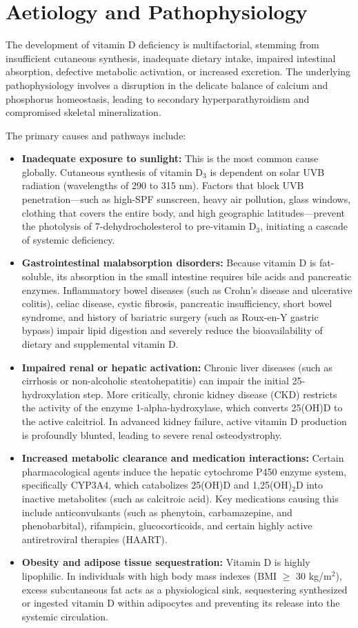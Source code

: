 \section*{Aetiology and Pathophysiology}
The development of vitamin D deficiency is multifactorial, stemming from insufficient cutaneous synthesis, inadequate dietary intake, impaired intestinal absorption, defective metabolic activation, or increased excretion. The underlying pathophysiology involves a disruption in the delicate balance of calcium and phosphorus homeostasis, leading to secondary hyperparathyroidism and compromised skeletal mineralization.

The primary causes and pathways include:
\begin{itemize}
    \item \textbf{Inadequate exposure to sunlight:} This is the most common cause globally. Cutaneous synthesis of vitamin D$_{3}$ is dependent on solar UVB radiation (wavelengths of 290 to 315 nm). Factors that block UVB penetration---such as high-SPF sunscreen, heavy air pollution, glass windows, clothing that covers the entire body, and high geographic latitudes---prevent the photolysis of 7-dehydrocholesterol to pre-vitamin D$_{3}$, initiating a cascade of systemic deficiency.
    \item \textbf{Gastrointestinal malabsorption disorders:} Because vitamin D is fat-soluble, its absorption in the small intestine requires bile acids and pancreatic enzymes. Inflammatory bowel diseases (such as Crohn's disease and ulcerative colitis), celiac disease, cystic fibrosis, pancreatic insufficiency, short bowel syndrome, and history of bariatric surgery (such as Roux-en-Y gastric bypass) impair lipid digestion and severely reduce the bioavailability of dietary and supplemental vitamin D.
    \item \textbf{Impaired renal or hepatic activation:} Chronic liver diseases (such as cirrhosis or non-alcoholic steatohepatitis) can impair the initial 25-hydroxylation step. More critically, chronic kidney disease (CKD) restricts the activity of the enzyme 1-alpha-hydroxylase, which converts 25(OH)D to the active calcitriol. In advanced kidney failure, active vitamin D production is profoundly blunted, leading to severe renal osteodystrophy.
    \item \textbf{Increased metabolic clearance and medication interactions:} Certain pharmacological agents induce the hepatic cytochrome P450 enzyme system, specifically CYP3A4, which catabolizes 25(OH)D and 1,25(OH)$_{2}$D into inactive metabolites (such as calcitroic acid). Key medications causing this include anticonvulsants (such as phenytoin, carbamazepine, and phenobarbital), rifampicin, glucocorticoids, and certain highly active antiretroviral therapies (HAART).
    \item \textbf{Obesity and adipose tissue sequestration:} Vitamin D is highly lipophilic. In individuals with high body mass indexes (BMI $\ge$ 30 kg/m$^{2}$), excess subcutaneous fat acts as a physiological sink, sequestering synthesized or ingested vitamin D within adipocytes and preventing its release into the systemic circulation.
\end{itemize}

